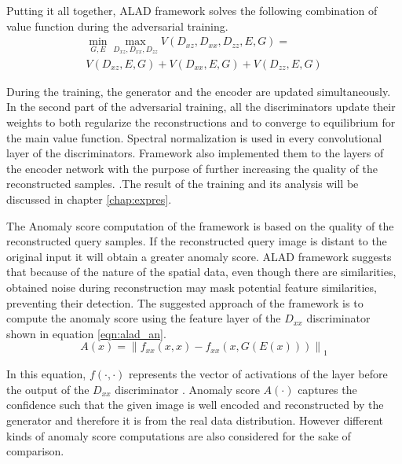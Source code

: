 Putting it all together, ALAD framework solves the following combination of value function during the adversarial
training. 
\begin{equation}
\begin{array}{l}{\min _{G, E} \max _{D_{x z}, D_{x x}, D_{z z}} V\left(D_{x z}, D_{x x}, D_{z z}, E, G\right)=} \\ {V\left(D_{x z}, E, G\right)+V\left(D_{x x}, E, G\right)+V\left(D_{z z}, E, G\right)}\end{array} 
\end{equation}

During the training, the generator and the encoder are updated simultaneously. In the
second part of the adversarial training, all the discriminators update their weights to both
regularize the reconstructions and to converge to equilibrium for the main value function. Spectral
normalization is used in every convolutional layer of the discriminators. Framework also implemented
them to the layers of the encoder network with the purpose of  further increasing the quality of the reconstructed
samples. \cite{DBLP:journals/corr/abs-1812-02288}.The
result of the training and its analysis will be discussed in chapter \ref{chap:expres}.

The Anomaly score computation of the framework is based on the quality of the reconstructed query
samples. If the reconstructed query image is distant to the original input it will obtain a greater
anomaly score. ALAD framework suggests that because of the nature of the spatial data, even though
there are similarities, obtained noise during reconstruction may mask potential feature
similarities, preventing their detection. The suggested approach of the framework is to compute the
anomaly score using the feature layer of the $D_{xx}$ discriminator shown in equation
\ref{eqn:alad_an}.
\begin{equation}
  \label{eqn:alad_an}
  A(x)=\left\|f_{x x}(x, x)-f_{x x}(x, G(E(x)))\right\|_{1} 
\end{equation}

In this equation, $f(\cdot, \cdot)$ represents the vector of activations of the layer before the
output of the $D_{xx}$ discriminator \cite{DBLP:journals/corr/abs-1812-02288}. Anomaly score
$A(\cdot)$ captures the confidence such that the given image is well encoded and reconstructed by
the generator and therefore it is from the real data distribution.
\cite{DBLP:journals/corr/abs-1812-02288} However different kinds of anomaly score computations are
also considered for the sake of comparison. 

